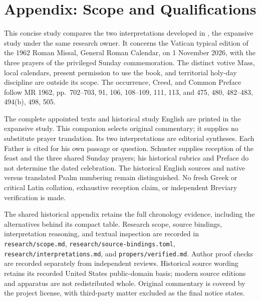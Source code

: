 \section{Appendix: Scope and Qualifications}
This concise study compares the two interpretations developed in
,
the expansive study under the same research owner. It concerns the
Vatican typical edition of the 1962 Roman Missal, General Roman Calendar,
on 1 November 2026, with the three prayers of the privileged Sunday
commemoration. The distinct votive Mass, local calendars, present
permission to use the book, and territorial holy-day discipline are
outside its scope. The occurrence, Creed, and Common Preface follow
MR 1962, pp.~702--703,  91, 106,
108--109, 111, 113, and 
475, 480, 482--483, 494(b), 498, 505.

The complete appointed texts and historical study English are printed
in the expansive study. This companion selects original commentary;
it supplies no substitute prayer translation. Its two interpretations
are editorial syntheses. Each Father is cited for his own passage
or question. Schuster supplies reception of the feast and the three
shared Sunday prayers; his historical rubrics and Preface do not
determine the dated celebration. The historical English sources
and native versus translated Psalm numbering remain distinguished.
No fresh Greek or critical Latin collation, exhaustive reception
claim, or independent Breviary verification is made.

The shared historical appendix retains the full chronology evidence,
including the alternatives behind its compact table. Research scope,
source bindings, interpretation reasoning, and textual inspection are
recorded in \texttt{research/scope.md},
\texttt{research/source-bindings.toml},
\texttt{research/interpretations.md}, and \texttt{propers/verified.md}.
Author proof checks are recorded separately from independent reviews.
Historical source wording retains its recorded United States
public-domain basis; modern source editions and apparatus are not
redistributed whole. Original commentary is covered by the project
license, with third-party matter excluded as the final notice states.

